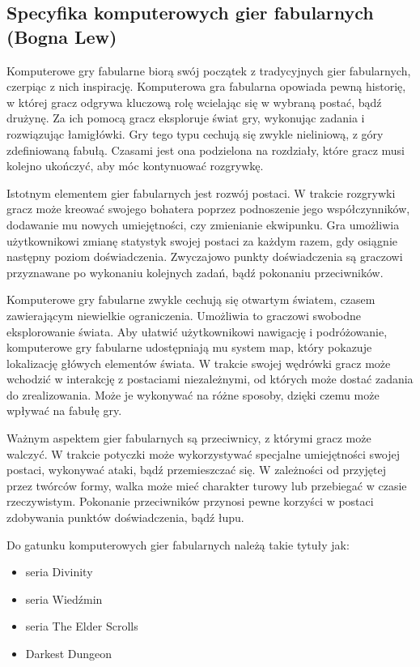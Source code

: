 \subsection{Specyfika komputerowych gier fabularnych (Bogna Lew)}
Komputerowe gry fabularne biorą swój początek z tradycyjnych gier fabularnych, czerpiąc z nich inspirację. Komputerowa
gra fabularna opowiada pewną historię, w której gracz odgrywa kluczową rolę wcielając się w wybraną postać, bądź drużynę.
Za ich pomocą gracz eksploruje świat gry, wykonując zadania i rozwiązując łamigłówki. Gry tego typu cechują się zwykle
nieliniową, z góry zdefiniowaną fabułą. Czasami jest ona podzielona na rozdziały, które gracz musi kolejno ukończyć, aby
móc kontynuować rozgrywkę.

Istotnym elementem gier fabularnych jest rozwój postaci. W trakcie rozgrywki gracz może kreować swojego bohatera
poprzez podnoszenie jego współczynników, dodawanie mu nowych umiejętności, czy zmienianie ekwipunku. Gra umożliwia
użytkownikowi zmianę statystyk swojej postaci za każdym razem, gdy osiągnie następny poziom doświadczenia. Zwyczajowo
punkty doświadczenia są graczowi przyznawane po wykonaniu kolejnych zadań, bądź pokonaniu przeciwników.

Komputerowe gry fabularne zwykle cechują się otwartym światem, czasem zawierającym niewielkie ograniczenia. Umożliwia
to graczowi swobodne eksplorowanie świata. Aby ułatwić użytkownikowi nawigację i podróżowanie, komputerowe gry fabularne
udostępniają mu system map, który pokazuje lokalizację główych elementów świata. W trakcie swojej wędrówki gracz może
wchodzić w interakcję z postaciami niezależnymi, od których może dostać zadania do zrealizowania. Może je wykonywać na
różne sposoby, dzięki czemu może wpływać na fabułę gry.

Ważnym aspektem gier fabularnych są przeciwnicy, z którymi gracz może walczyć. W trakcie potyczki może wykorzystywać
specjalne umiejętności swojej postaci, wykonywać ataki, bądź przemieszczać się. W zależności od przyjętej przez twórców
formy, walka może mieć charakter turowy lub przebiegać w czasie rzeczywistym. Pokonanie przeciwników przynosi pewne
korzyści w postaci zdobywania punktów doświadczenia, bądź łupu.

Do gatunku komputerowych gier fabularnych należą takie tytuły jak:
\begin{itemize}
  \item seria Divinity
  \item seria Wiedźmin
  \item seria The Elder Scrolls
  \item Darkest Dungeon
\end{itemize}